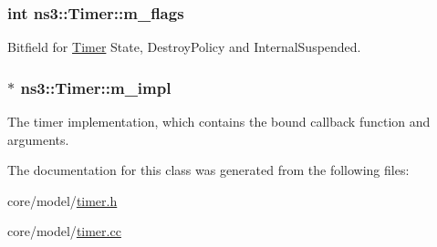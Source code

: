 \subsubsection[{\texorpdfstring{m\+\_\+flags}{m_flags}}]{\setlength{\rightskip}{0pt plus 5cm}int ns3\+::\+Timer\+::m\+\_\+flags\hspace{0.3cm}{\ttfamily [private]}}\hypertarget{classns3_1_1Timer_a807d2dc469a7a90e18ab39f50edd420f}{}\label{classns3_1_1Timer_a807d2dc469a7a90e18ab39f50edd420f}
Bitfield for \hyperlink{classns3_1_1Timer}{Timer} State, Destroy\+Policy and Internal\+Suspended. 
\subsubsection[{\texorpdfstring{m\+\_\+impl}{m_impl}}]{$\ast$ ns3\+::\+Timer\+::m\+\_\+impl\hspace{0.3cm}{\ttfamily [private]}}\hypertarget{classns3_1_1Timer_a2a82602577e5145f094205e076850e64}{}\label{classns3_1_1Timer_a2a82602577e5145f094205e076850e64}
The timer implementation, which contains the bound callback function and arguments. 

The documentation for this class was generated from the following files\+:\begin{DoxyCompactItemize}
\item 
core/model/\hyperlink{timer_8h}{timer.\+h}\item 
core/model/\hyperlink{timer_8cc}{timer.\+cc}\end{DoxyCompactItemize}
